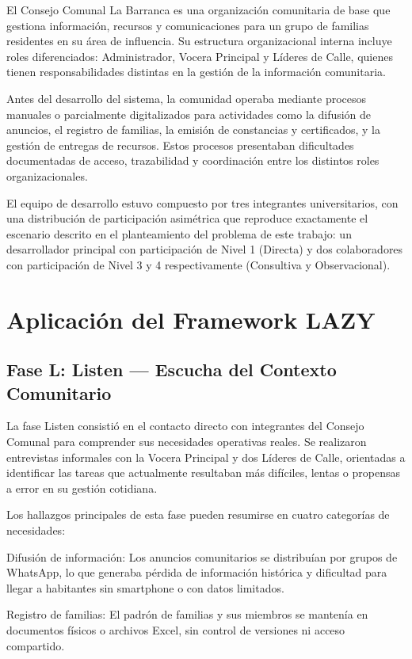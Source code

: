 \documentclass[14pt,a4paper,oneside]{extbook}
\begin{document}
El Consejo Comunal La Barranca es una organización comunitaria de base que gestiona información, recursos y comunicaciones para un grupo de familias residentes en su área de influencia. Su estructura organizacional interna incluye roles diferenciados: Administrador, Vocera Principal y Líderes de Calle, quienes tienen responsabilidades distintas en la gestión de la información comunitaria.

Antes del desarrollo del sistema, la comunidad operaba mediante procesos manuales o parcialmente digitalizados para actividades como la difusión de anuncios, el registro de familias, la emisión de constancias y certificados, y la gestión de entregas de recursos. Estos procesos presentaban dificultades documentadas de acceso, trazabilidad y coordinación entre los distintos roles organizacionales.

El equipo de desarrollo estuvo compuesto por tres integrantes universitarios, con una distribución de participación asimétrica que reproduce exactamente el escenario descrito en el planteamiento del problema de este trabajo: un desarrollador principal con participación de Nivel 1 (Directa) y dos colaboradores con participación de Nivel 3 y 4 respectivamente (Consultiva y Observacional).

\section{Aplicación del Framework LAZY}

\subsection{Fase L: Listen — Escucha del Contexto Comunitario}

La fase Listen consistió en el contacto directo con integrantes del Consejo Comunal para comprender sus necesidades operativas reales. Se realizaron entrevistas informales con la Vocera Principal y dos Líderes de Calle, orientadas a identificar las tareas que actualmente resultaban más difíciles, lentas o propensas a error en su gestión cotidiana.

Los hallazgos principales de esta fase pueden resumirse en cuatro categorías de necesidades:

Difusión de información: Los anuncios comunitarios se distribuían por grupos de WhatsApp, lo que generaba pérdida de información histórica y dificultad para llegar a habitantes sin smartphone o con datos limitados.

Registro de familias: El padrón de familias y sus miembros se mantenía en documentos físicos o archivos Excel, sin control de versiones ni acceso compartido.
\end{document}
